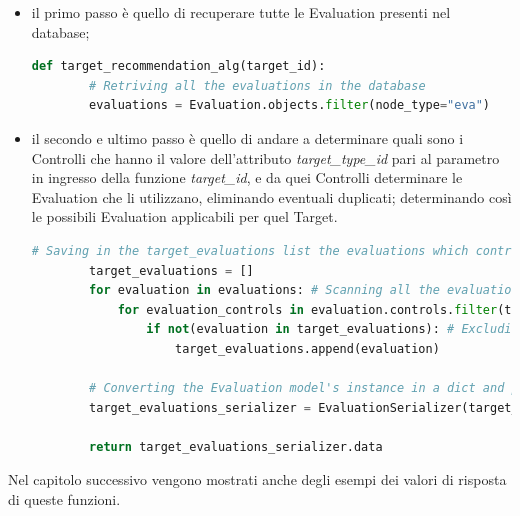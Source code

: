 \begin{itemize}
    \item il primo passo è quello di recuperare tutte le Evaluation presenti nel database;
    \begin{lstlisting}[language=Python, label=lst:IB_CF_Target_1]
    def target_recommendation_alg(target_id):
        # Retriving all the evaluations in the database
        evaluations = Evaluation.objects.filter(node_type="eva")
    \end{lstlisting} 
    \item il secondo e ultimo passo è quello di andare a determinare quali sono i Controlli che hanno il valore dell'attributo \textit{target\_type\_id} 
    pari al parametro in ingresso della funzione \textit{target\_id}, e da quei Controlli determinare le Evaluation che li utilizzano, 
    eliminando eventuali duplicati; determinando così le possibili Evaluation applicabili per quel Target.
    \begin{lstlisting}[language=Python, label=lst:IB_CF_Target_2]
        # Saving in the target_evaluations list the evaluations which controls have target_type_id equal to target_id
        target_evaluations = []
        for evaluation in evaluations: # Scanning all the evaluations
            for evaluation_controls in evaluation.controls.filter(target_type_id=target_id):
                if not(evaluation in target_evaluations): # Excluding evaluations duplicated
                    target_evaluations.append(evaluation)
        
        # Converting the Evaluation model's instance in a dict and putting the evaluation, as a dict, in a list
        target_evaluations_serializer = EvaluationSerializer(target_evaluations, many=True)
        
        return target_evaluations_serializer.data
    \end{lstlisting} 
\end{itemize}
%
Nel capitolo successivo vengono mostrati anche degli esempi dei valori di risposta di queste funzioni.
%
